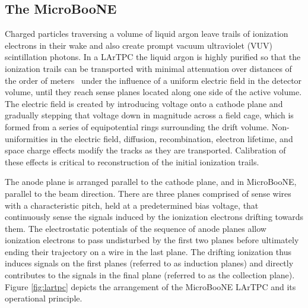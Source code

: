 \subsection{The MicroBooNE \lartpc}

Charged particles traversing a volume of liquid argon leave trails of ionization electrons in their wake and also create prompt vacuum ultraviolet (VUV) scintillation photons.  In a LArTPC the liquid argon is highly purified so that the ionization trails can be transported with minimal attenuation over distances of the order of meters~\cite{Aprile:1985} under the influence of a uniform electric field in the detector volume, until they reach sense planes located along one side of the active volume.   The electric field is created by introducing voltage onto a cathode plane and gradually stepping that voltage down in magnitude across a field cage, which is formed from a series of equipotential rings surrounding the drift volume.   Non-uniformities in the electric field, diffusion, recombination, electron lifetime, and space charge effects modify the tracks as they are transported.  Calibration of these effects is critical to reconstruction of the initial ionization trails.   

The anode plane is arranged parallel to the cathode plane, and in MicroBooNE, parallel to the beam direction.   There are three planes comprised of sense wires with a characteristic pitch, held at a predetermined bias voltage, that continuously sense the signals induced by the ionization electrons drifting towards them. The electrostatic potentials of the sequence of anode planes allow ionization electrons to pass undisturbed by the first two planes before ultimately ending their trajectory on a wire in the last plane. The drifting ionization thus induces signals on the first planes (referred to as induction planes) and directly contributes to the signals in the final plane (referred to as the collection plane).  Figure \ref{fig:lartpc} depicts the arrangement of the MicroBooNE LArTPC and its operational principle.


